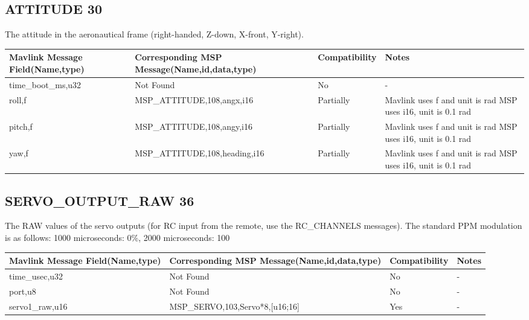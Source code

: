 
\subsection{ATTITUDE 30} 
The attitude in the aeronautical frame (right-handed, Z-down, X-front, Y-right).\\

{
\centering
\begin{tabular}{ |p{4cm  } |p{7cm} | p{2cm}|m{5em}|}
\hline
Mavlink Message Field(Name,type)&Corresponding MSP Message(Name,id,data,type)& Compatibility & Notes\\
\hline
time\_boot\_ms,u32 & Not Found & No & - \\
\hline
\rowcolor{lightgray}
roll,f & MSP\_ATTITUDE,108,angx,i16& Partially & Mavlink uses f and unit is rad MSP uses i16, unit is 0.1 rad  \\
\hline
\rowcolor{lightgray}
pitch,f & MSP\_ATTITUDE,108,angy,i16& Partially & Mavlink uses f and unit is rad MSP uses i16, unit is 0.1 rad  \\
\hline
\rowcolor{lightgray}
yaw,f & MSP\_ATTITUDE,108,heading,i16& Partially & Mavlink uses f and unit is rad MSP uses i16, unit is 0.1 rad  \\



\end{tabular}
}

\cleardoublepage







\subsection{SERVO\_OUTPUT\_RAW 36} 
The RAW values of the servo outputs (for RC input from the remote, use the RC\_CHANNELS messages). The standard PPM modulation is as follows: 1000 microseconds: 0\%, 2000 microseconds: 100%

{
\centering
\begin{tabular}{ |p{4cm  } |p{7cm} | p{2cm}|m{5em}|}
\hline
Mavlink Message Field(Name,type)&Corresponding MSP Message(Name,id,data,type)& Compatibility & Notes\\
\hline
time\_usec,u32 & Not Found & No & - \\
\hline
port,u8 & Not Found & No & - \\
\rowcolor{green}
\hline
servo1\_raw,u16 & MSP\_SERVO,103,Servo*8,[u16;16]& Yes  & - \\

\end{tabular}
}

